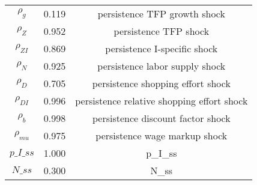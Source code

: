 \begin{center}
\begin{longtable}{ccc}
${\rho_g}$ 	 & 	 0.119 	 & 	 persistence TFP growth shock\\
${\rho_Z}$ 	 & 	 0.952 	 & 	 persistence TFP shock\\
${\rho_{ZI}}$ 	 & 	 0.869 	 & 	 persistence I-specific shock\\
${\rho_N}$ 	 & 	 0.925 	 & 	 persistence labor supply shock\\
${\rho_D}$ 	 & 	 0.705 	 & 	 persistence shopping effort shock\\
${\rho_{DI}}$ 	 & 	 0.996 	 & 	 persistence relative shopping effort shock\\
${\rho_b}$ 	 & 	 0.998 	 & 	 persistence discount factor shock\\
${\rho_{mu}}$ 	 & 	 0.975 	 & 	 persistence wage markup shock\\
$p\_I\_ss$ 	 & 	 1.000 	 & 	 p\_I\_ss\\
$N\_ss$ 	 & 	 0.300 	 & 	 N\_ss\\
\bottomrule%
\end{longtable}
\end{center}
